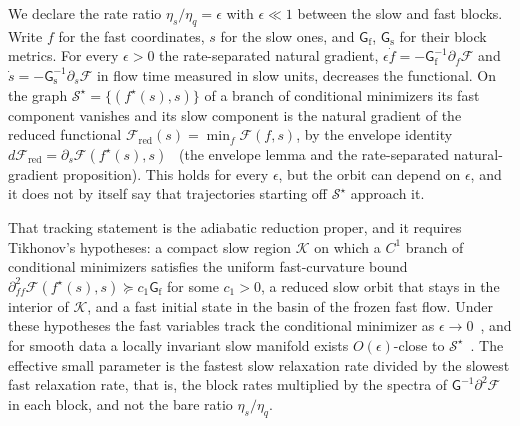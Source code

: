 We declare the rate ratio $\eta_s/\eta_q = \epsilon$ with $\epsilon \ll 1$ between the slow and fast blocks. Write $f$ for the fast coordinates, $s$ for the slow ones, and $\mathsf G_{\mathrm f}$, $\mathsf G_{\mathrm s}$ for their block metrics. For every $\epsilon > 0$ the rate-separated natural gradient, $\epsilon\dot f = -\mathsf G_{\mathrm f}^{-1}\partial_f\mathcal{F}$ and $\dot s = -\mathsf G_{\mathrm s}^{-1}\partial_s\mathcal{F}$ in flow time measured in slow units, decreases the functional. On the graph $\mathcal{S}^\star = \{(f^\star(s), s)\}$ of a branch of conditional minimizers its fast component vanishes and its slow component is the natural gradient of the reduced functional $\mathcal{F}_{\mathrm{red}}(s) = \min_f \mathcal{F}(f, s)$, by the envelope identity $d\mathcal{F}_{\mathrm{red}} = \partial_s\mathcal{F}(f^\star(s), s)$~\cite[Ch.~8]{DennisGaugeVFE2026} (the envelope lemma and the rate-separated natural-gradient proposition). This holds for every $\epsilon$, but the orbit can depend on $\epsilon$, and it does not by itself say that trajectories starting off $\mathcal{S}^\star$ approach it.

That tracking statement is the adiabatic reduction proper, and it requires Tikhonov's hypotheses: a compact slow region $\mathcal{K}$ on which a $C^1$ branch of conditional minimizers satisfies the uniform fast-curvature bound $\partial^2_{ff}\mathcal{F}(f^\star(s), s) \succeq c_1 \mathsf G_{\mathrm f}$ for some $c_1 > 0$, a reduced slow orbit that stays in the interior of $\mathcal{K}$, and a fast initial state in the basin of the frozen fast flow. Under these hypotheses the fast variables track the conditional minimizer as $\epsilon \to 0$~\cite{Tikhonov1952}, and for smooth data a locally invariant slow manifold exists $O(\epsilon)$-close to $\mathcal{S}^\star$~\cite{fenichel1979geometric}. The effective small parameter is the fastest slow relaxation rate divided by the slowest fast relaxation rate, that is, the block rates multiplied by the spectra of $\mathsf G^{-1}\partial^2\mathcal{F}$ in each block, and not the bare ratio $\eta_s/\eta_q$.

